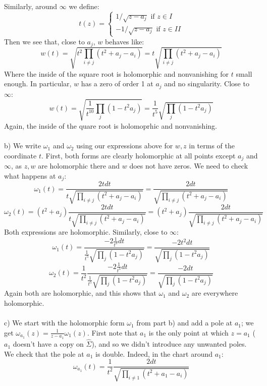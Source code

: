 \documentclass[12 pt]{article}
\theoremstyle{plain}
\theoremstyle{definition}
\theoremstyle{remark}
\begin{document}
Similarly, around $\infty$ we define:
\[      t(z) =   \left\{  \begin{array} {c}  1/\sqrt{z-a_j} \text{ if } z\in I \\ -1/\sqrt{z-a_j} \text{ if } z\in II  \end{array} \right.       \]
Then we see that, close to $a_j$, $w$ behaves like:
\[     w(t) = \sqrt{t^2 \prod_{i\neq j} (t^2 + a_j - a_i)}  = t \sqrt{ \prod_{i\neq j} (t^2 + a_j - a_i)}    \]
Where the inside of the square root is holomorphic and nonvanishing for $t$ small enough. In particular, $w$ has a zero of order 1 at $a_j$ and no singularity. Close to $\infty$:
\[     w(t) = \sqrt{\frac{1}{t^{10}} \prod_j (1 - t^2 a_j)} = \frac{1}{t^5}   \sqrt{ \prod_j (1 - t^2 a_j)} \]
Again, the inside of the quare root is holomoprhic and nonvanishing.
\\
\\
b) We write $\omega_1$ and $\omega_2$ using our expressions above for $w, z$ in terms of the coordinate $t$. First, both forms are clearly holomorphic at all points except $a_j$ and $\infty$, as $z, w$ are holomorphic there and $w$ does not have zeros. We need to check what happens at $a_j$:
\[      \omega_1 (t) = \frac{2t dt}{ t \sqrt{ \prod_{i\neq j} (t^2 + a_j - a_i)}}  =  \frac{2 dt}{  \sqrt{ \prod_{i\neq j} (t^2 + a_j - a_i)}}    \]
\[       \omega_2 (t) = (t^2 + a_j) \frac{2t dt}{ t \sqrt{ \prod_{i\neq j} (t^2 + a_j - a_i)}}  = (t^2 + a_j) \frac{2 dt}{  \sqrt{ \prod_{i\neq j} (t^2 + a_j - a_i)}}      \]
Both expressions are holomorphic. Similarly, close to $\infty$:
\[      \omega_1(t) = \frac{ - 2 \frac{1}{t^3} dt} {  \frac{1}{t^5}   \sqrt{ \prod_j (1 - t^2 a_j)} } = \frac{ - 2 t^2 dt} {    \sqrt{ \prod_j (1 - t^2 a_j)} }    \]
\[       \omega_2(t) =   \frac{1}{t^2}  \frac{ - 2 \frac{1}{t^3} dt} {  \frac{1}{t^5}   \sqrt{ \prod_j (1 - t^2 a_j)} } = \frac{ - 2 dt} {    \sqrt{ \prod_j (1 - t^2 a_j)} }      \]
Again both are holomorphic, and this shows that $\omega_1$ and $\omega_2$ are everywhere holomorphic.
\\
\\
c) We start with the holomorphic form $\omega_1$ from part b) and add a pole at $a_1$; we get $\omega_{a_1} (z) = \frac{1}{z-a_1} \omega_1(z)$. First note that $a_1$ is the only point at which $z = a_1$ ($a_1$ doesn't have a copy on $\hat \Sigma$), and so we didn't introduce any unwanted poles. We check that the pole at $a_1$ is double. Indeed, in the chart around $a_1$:
\[     \omega_{a_1} (t) = \frac{1}{t^2}   \frac{2 dt}{  \sqrt{ \prod_{i\neq 1} (t^2 + a_1 - a_i)}}      \]
\end{document}
